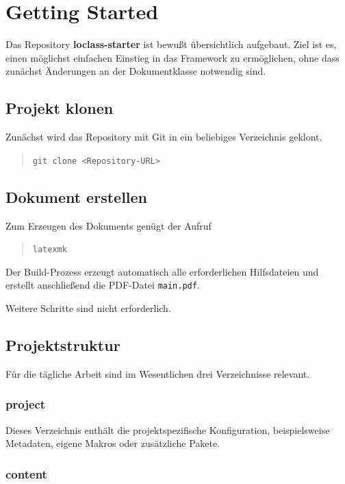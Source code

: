 \chapter{Getting Started}

Das Repository \textbf{loclass-starter} ist bewußt übersichtlich aufgebaut. Ziel ist es, einen möglichst einfachen Einstieg in das Framework zu ermöglichen, ohne dass zunächst Änderungen an der Dokumentklasse notwendig sind.

\section{Projekt klonen}

Zunächst wird das Repository mit Git in ein beliebiges Verzeichnis geklont.

\begin{quote}
\texttt{git clone <Repository-URL>}
\end{quote}

\section{Dokument erstellen}

Zum Erzeugen des Dokuments genügt der Aufruf

\begin{quote}
\texttt{latexmk}
\end{quote}

Der Build-Prozess erzeugt automatisch alle erforderlichen Hilfsdateien und erstellt anschließend die PDF-Datei \texttt{main.pdf}.

Weitere Schritte sind nicht erforderlich.

\section{Projektstruktur}

Für die tägliche Arbeit sind im Wesentlichen drei Verzeichnisse relevant.

\subsection*{project}

Dieses Verzeichnis enthält die projektspezifische Konfiguration, beispielsweise Metadaten, eigene Makros oder zusätzliche Pakete.

\subsection*{content}

